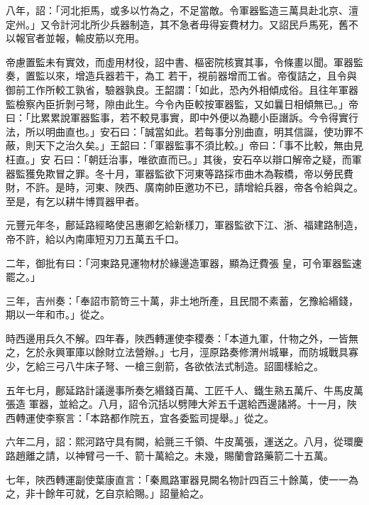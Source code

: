 \begin{pinyinscope}
 八年，詔：「河北拒馬，或多以竹為之，不足當敵。令軍器監造三萬具赴北京、澶定州。」又令計河北所少兵器制造，其不急者毋得妄費材力。又詔民戶馬死，舊不以報官者並報，輸皮筋以充用。



 帝慮置監未有實效，而虛用材役，詔中書、樞密院核實其事，令條畫以聞。軍器監奏，置監以來，增造兵器若干，為工
 若干，視前器增而工省。帝復詰之，且令與御前工作所較工孰省，驗器孰良。王韶謂：「如此，恐內外相傾成俗。且往年軍器監檢察內臣折剝弓弩，隙由此生。今令內臣較按軍器監，又如曩日相傾無已。」帝曰：「比累累說軍器監事，若不較見事實，即中外便以為聽小臣譖訴。今令得實行法，所以明曲直也。」安石曰：「誠當如此。若每事分別曲直，明其信誕，使功罪不蔽，則天下之治久矣。」王韶曰：「軍器監事不須比較。」帝曰：「事不比較，無由見枉直。」安
 石曰：「朝廷治事，唯欲直而已。」其後，安石卒以辯口解帝之疑，而軍器監獲免欺冒之罪。冬十月，軍器監欲下河東等路採市曲木為鞍橋，帝以勞民費財，不許。是時，河東、陜西、廣南帥臣邀功不已，請增給兵器，帝各令給與之。至是，有乞以耕牛博買器甲者。



 元豐元年冬，鄜延路經略使呂惠卿乞給新樣刀，軍器監欲下江、浙、福建路制造，帝不許，給以內南庫短刃刀五萬五千口。



 二年，御批有曰：「河東路見運物材於緣邊造軍器，顯為迂費張
 皇，可令軍器監速罷之。」



 三年，吉州奏：「奉詔市箭笴三十萬，非土地所產，且民間不素蓄，乞豫給緡錢，期以一年和市。」從之。



 時西邊用兵久不解。四年春，陜西轉運使李稷奏：「本道九軍，什物之外，一皆無之，乞於永興軍庫以餘財立法營辦。」七月，涇原路奏修渭州城畢，而防城戰具寡少，乞給三弓八牛床子弩、一槍三劍箭，各欲依法式制造。詔圖樣給之。



 五年七月，鄜延路計議邊事所奏乞緡錢百萬、工匠千人、鐵生熟五萬斤、牛馬皮萬張造
 軍器，並給之。八月，詔令沉括以劈陣大斧五千選給西邊諸將。十一月，陜西轉運使李察言：「本路都作院五，宜各委監司提舉。」從之。



 六年二月，詔：熙河路守具有闕，給氈三千領、牛皮萬張，運送之。八月，從環慶路趙離之請，以神臂弓一千、箭十萬給之。未幾，賜蘭會路藥箭二十五萬。



 七年，陜西轉運副使葉康直言：「秦鳳路軍器見闕名物計四百三十餘萬，使一一為之，非十餘年可就，乞自京給賜。」詔量給之。




\end{pinyinscope}
